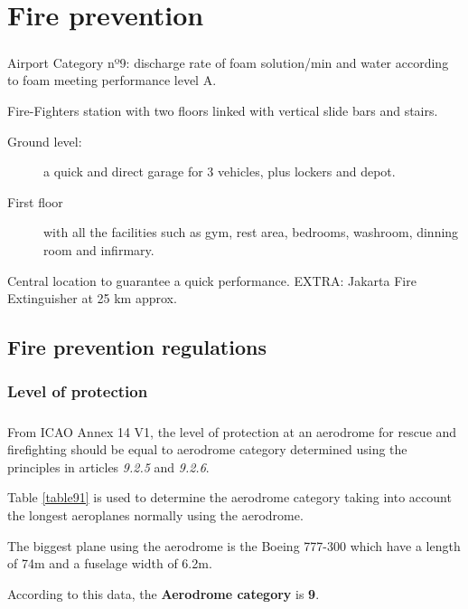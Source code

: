 \chapter{Fire prevention}
\paragraph{} Airport Category nº9:  discharge rate of foam solution/min and water according to foam meeting performance level A.

Fire-Fighters station with two floors linked with vertical slide bars and stairs. 

\begin{description}
	\item[Ground level:] a quick and direct garage for 3 vehicles, plus lockers and depot.
	\item[First floor] with all the facilities such as gym, rest area, bedrooms, washroom, dinning room and infirmary.
\end{description}
Central location to guarantee a quick performance.
EXTRA:  Jakarta Fire Extinguisher at 25 km approx.

	\section{Fire prevention regulations }
		\subsection{Level of protection}
		\paragraph{} From ICAO Annex 14 V1, the level of protection at an aerodrome for rescue and firefighting should be equal to aerodrome category determined using the principles in articles \textit{9.2.5} and \textit{9.2.6}.
		
		Table \ref{table91} is used to determine the aerodrome category taking into account the longest aeroplanes normally using the aerodrome.
		
		The biggest plane using the aerodrome is the Boeing 777-300 which have a length of 74m and a fuselage width of 6.2m.
		
		According to this data, the \textbf{Aerodrome category} is \textbf{9}.
		
